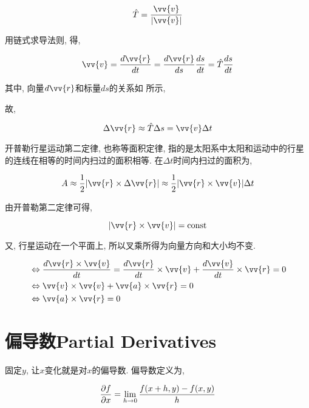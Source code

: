 \begin{equation}
\hat{T}=\frac{\vv{v}}{|\vv{v}|}
\end{equation}

用链式求导法则, 得,

\begin{equation}
\vv{v}=\df{\vv{r}}{t}=\df{\vv{r}}{s} \df{s}{t}=\hat{T} \df{s}{t}
\end{equation}

其中, 向量$ d\vv{r} $和标量$ ds $的关系如 所示,

故,

\begin{equation}
\Delta \vv{r} \approx \hat{T}\Delta s = \vv{v}\Delta t
\end{equation}

开普勒行星运动第二定律, 也称等面积定律, 指的是太阳系中太阳和运动中的行星的连线在相等的时间内扫过的面积相等. 在$ \Delta t $时间内扫过的面积为,

\begin{equation}
A\approx \frac{1}{2}|\vv{r} \times \Delta \vv{r}| \approx \frac{1}{2}|\vv{r}\times \vv{v}|\Delta t
\end{equation}

由开普勒第二定律可得,

\begin{equation}
|\vv{r}\times \vv{v}|=\text{const}
\end{equation}

又, 行星运动在一个平面上, 所以叉乘所得为向量方向和大小均不变.

\begin{equation}
\begin{aligned}
&\Leftrightarrow \df{\vv{r}\times\vv{v}}{t}=
\df{\vv{r}}{t}\times\vv{v}+\df{\vv{v}}{t}\times\vv{r}=0 \\
&\Leftrightarrow \vv{v}\times\vv{v}+\vv{a}\times\vv{r}=0 \\
&\Leftrightarrow \vv{a}\times\vv{r}=0
\end{aligned}
\end{equation}

\section{偏导数Partial Derivatives}

固定$ y $, 让$ x $变化就是对$ x $的偏导数. 偏导数定义为,

\begin{equation}
\frac{\partial f}{\partial x} = \lim_{h\rightarrow 0} \frac{f(x+h,y)-f(x,y)}{h}
\end{equation}

